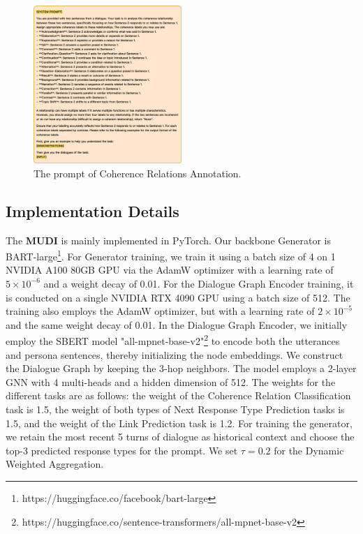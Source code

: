 \documentclass[letterpaper]{article} %
\begin{document}
\begin{figure}[ht]
    \centering
    \includegraphics[width=0.5\textwidth]{./images/coherence_reltaions_annotated_prompt.png}
    \caption{The prompt of Coherence Relations Annotation.}
    \label{fig:coherence_reltaions_annotated_prompt}
\end{figure}

\subsection{Implementation Details}
The \textbf{MUDI} is mainly implemented in PyTorch. Our backbone Generator is BART-large\footnote[2]{https://huggingface.co/facebook/bart-large}. For Generator training, we train it using a batch size of 4 on 1 NVIDIA A100 80GB
GPU via the AdamW optimizer with a learning rate of \(5 \times 10^{-6}\) and a
weight decay of 0.01. For the Dialogue Graph Encoder training, it is conducted on a single NVIDIA RTX 4090 GPU using a batch size of 512. The training also employs the AdamW optimizer, but with a learning rate of \(2 \times 10^{-5}\) and the same weight decay of 0.01. In the Dialogue Graph Encoder, we initially employ the SBERT model "all-mpnet-base-v2"\footnote[3]{https://huggingface.co/sentence-transformers/all-mpnet-base-v2} to encode both the utterances and persona sentences, thereby initializing the node embeddings. We construct the Dialogue Graph by keeping the 3-hop neighbors. The model employs a 2-layer GNN with 4 multi-heads and a hidden dimension of 512. The weights for the different tasks are as follows: the weight of the Coherence Relation Classification task is 1.5, the weight of both types of Next Response Type Prediction tasks is 1.5, and the weight of the Link Prediction task is 1.2. For training the generator, we retain the most recent 5 turns of dialogue as historical context and choose the top-3 predicted response types for the prompt. We set \(\tau = 0.2\) for the Dynamic Weighted Aggregation.
\end{document}
